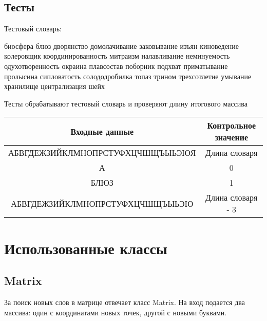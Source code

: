 \documentclass[a4paper,14pt]{article}
\begin{document}
	\subsection{Тесты}
	Тестовый словарь:
	
	биосфера блюз дворянство домолачивание заковывание изъян киноведение колеровщик координированность митраизм налавливание неминуемость одухотворенность окраина плавсостав поборник подхват приматывание пролысина сипловатость солододробилка топаз трином трехсотлетие умывание хранилище централизация шейх 

	Тесты обрабатывают тестовый словарь и проверяют длину итогового массива
	
	\begin{tabular}{|c|c|}
		\hline
		         Входные данные          & Контрольное значение \\ \hline
		АБВГДЕЖЗИЙКЛМНОПРСТУФХЦЧШЩЪЫЬЭЮЯ &    Длина словаря     \\ \hline
		               А                 &          0           \\ \hline
		              БЛЮЗ               &          1           \\ \hline
		АБВГДЕЖЗИЙКЛМНОПРСТУФХЦЧШЩЪЫЬЭЮ  &  Длина словаря - 3   \\ \hline
	\end{tabular}
	
\section{Использованные классы}
	\subsection{Matrix}
	За поиск новых слов в матрице отвечает класс Matrix. На вход подается два массива: один с координатами новых точек, другой с новыми буквами.
\end{document}

